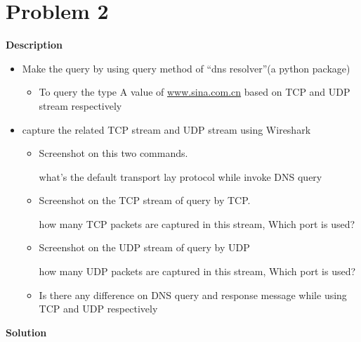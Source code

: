 \documentclass[12pt,letterpaper]{ctexart}
\begin{document}
\newpage

\section*{Problem 2}

{\bf Description}

\begin{itemize}
  \item Make the query by using query method of ``dns resolver''(a python package)
  \begin{itemize}
    \item To query the type A value of \href{www.sina.com.cn}{www.sina.com.cn} based on TCP and UDP stream respectively
  \end{itemize}
  \item capture the related TCP stream and UDP stream using Wireshark
  \begin{itemize}
    \item Screenshot on this two commands.

    what's the default transport lay protocol while invoke DNS query
    \item Screenshot on the TCP stream of query by TCP.

    how many TCP packets are captured in this stream, Which port is used?
    \item Screenshot on the UDP stream of query by UDP

    how many UDP packets are captured in this stream, Which port is used?
    \item Is there any difference on DNS query and response message while using TCP and UDP respectively
  \end{itemize}
\end{itemize}


{\bf Solution}
\end{document}
